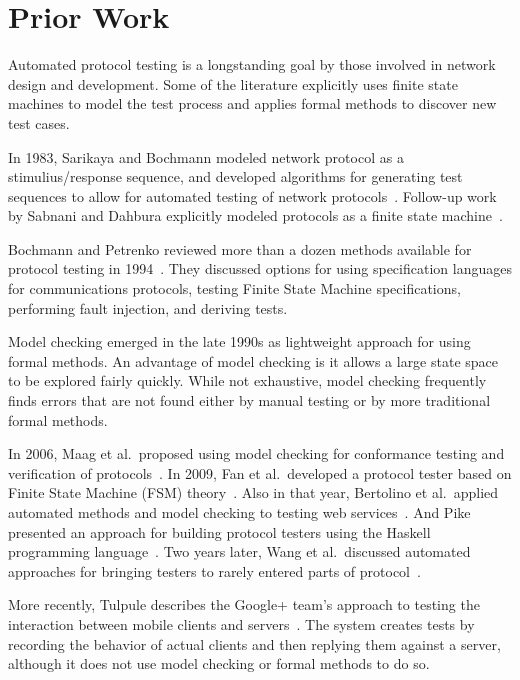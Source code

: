 \documentclass[preprint,3p,11pt]{elsarticle}
\begin{document}

\section{Prior Work}
Automated protocol testing is a longstanding goal by those involved in network design
and development. Some of the literature explicitly uses finite state
machines to model the test process and applies formal methods to
discover new test cases.

In 1983, Sarikaya and Bochmann modeled network protocol as a
stimulius/response sequence, and developed algorithms for generating
test sequences to allow for automated testing of network
protocols~\cite{Sarikaya:1983:SIP:1024840.1035264,Sarikaya:1983:SIP:1035237.1035264}.
Follow-up work by Sabnani and Dahbura explicitly modeled protocols as
a finite state machine~\cite{Sabnani:1985:NTG:319056.319003,Sabnani:1985:NTG:318951.319003}.

Bochmann and Petrenko reviewed more than a dozen methods available for protocol testing
in 1994~\cite{Bochmann:1994:PTR:186258.187153}. They discussed options
for using specification languages for communications protocols,
testing Finite State Machine specifications,
performing fault injection, and  deriving tests.

Model checking emerged in the late 1990s as lightweight approach for
using formal methods. An advantage of model checking is it allows a
large state space to be explored fairly quickly. While not exhaustive,
model checking frequently finds errors that are not found either by
manual testing or by more traditional formal methods.

In 2006, Maag et al.\ proposed using model checking for conformance testing and
verification of protocols~\cite{Maag:2006:TMA:1163653.1163663}. In 2009, Fan et al.\ developed a protocol tester based on Finite State Machine
(FSM) theory~\cite{Fan:2009:PPT:1582379.1582477}. Also in that year,
Bertolino et al.\ applied automated methods and model checking to
testing web services~\cite{Bertolino:2009:ASB:1595696.1595719}. And Pike presented an approach for building protocol testers using the
Haskell programming language~\cite{Pike:2009:RYO:1596638.1596646}. Two
years later, Wang et al.\ discussed automated approaches for bringing testers to rarely
entered parts of protocol~\cite{Wang:2011:ADP:2069131.2069166}.

More recently, Tulpule describes the Google+ team's approach to testing the
interaction between mobile clients and
servers~\cite{Tulpule:2013:STC:2542128.2542134}. The system creates
tests by recording the behavior of actual clients and then replying them
against a server, although it does not use model checking or formal
methods to do so. 
\end{document}
